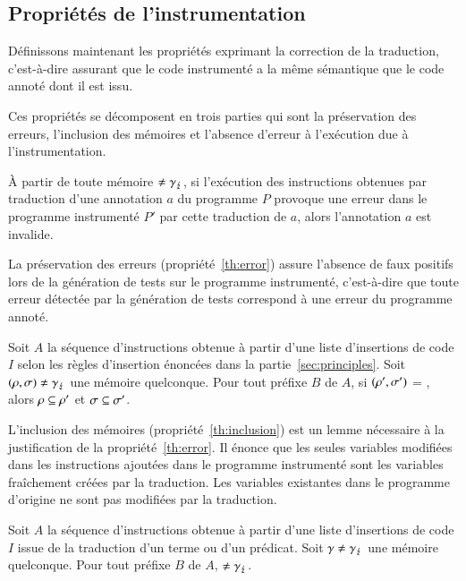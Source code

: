 \subsection{Propriétés de l'instrumentation}
\label{sec:properties}


Définissons maintenant les propriétés exprimant la correction de la traduction,
c'est-à-dire assurant que le code instrumenté a la même sémantique que le code
annoté dont il est issu.

Ces propriétés se décomposent en trois parties qui sont la préservation des
erreurs, l'inclusion des mémoires et l'absence d'erreur à l'exécution due à
l'instrumentation.

\begin{myproperty}
  \label{th:error}
  À partir de toute mémoire $\neq \gamma_\lightning$, si l'exécution des instructions
  obtenues par traduction d'une annotation $a$ du programme $P$ provoque une
  erreur dans le programme instrumenté $P'$ par cette traduction de $a$, alors
  l'annotation $a$ est invalide.
\end{myproperty}

La préservation des erreurs (propriété~\ref{th:error}) assure l'absence de faux
positifs lors de la génération de tests sur le programme instrumenté,
c'est-à-dire que toute erreur détectée par la génération de tests correspond à
une erreur du programme annoté.

\begin{myproperty}
  \label{th:inclusion}
  Soit $A$ la séquence d'instructions obtenue à partir d'une liste d'insertions
  de code $I$ selon les règles d'insertion énoncées dans la
  partie~\ref{sec:principles}.
  Soit $(\rho, \sigma) \neq \gamma_\lightning$ une mémoire quelconque.
  Pour tout préfixe $B$ de $A$, si
  $(\rho', \sigma')$ = , alors
  $\rho \subseteq \rho'$ et $\sigma \subseteq \sigma'$.
\end{myproperty}

L'inclusion des mémoires (propriété~\ref{th:inclusion}) est un lemme
nécessaire à la justification de la propriété~\ref{th:error}.
Il énonce que les seules variables modifiées dans les instructions ajoutées dans
le programme instrumenté sont les variables fraîchement créées par la
traduction.
Les variables existantes dans le programme d'origine ne sont pas modifiées par
la traduction.

\begin{myproperty}
  \label{lem:noerror}
  Soit $A$ la séquence d'instructions obtenue à partir d'une liste d'insertions
  de code $I$ issue de la traduction d'un terme ou d'un prédicat.
  Soit $\gamma \neq \gamma_\lightning$ une mémoire quelconque.
  Pour tout préfixe $B$ de $A$,  $\neq \gamma_\lightning$.
\end{myproperty}

